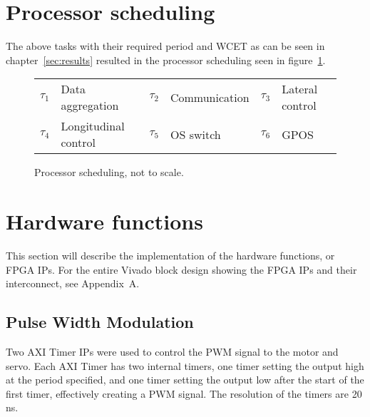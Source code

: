\section{Processor scheduling}
The above tasks with their required period and WCET as can be seen in chapter~\ref{sec:results} resulted in the processor scheduling seen in figure~\ref{fig:rtsched}.

\begin{figure}[H]
\centering
\begin{RTGrid}[nonumbers=1]{6}{25}








\end{RTGrid}
\caption{Processor scheduling, not to scale.}\label{fig:rtsched}
\begin{tabular}{r@{: }l r@{: }l r@{: }l}
$\tau_1$ & Data aggregation & $\tau_2$ & Communication & $\tau_3$ & Lateral control\\
$\tau_4$ & Longitudinal control & $\tau_5$ & OS switch & $\tau_6$ & GPOS
\end{tabular}
\end{figure}

\section{Hardware functions}
This section will describe the implementation of the hardware functions, or FPGA IPs. For the entire Vivado block design showing the FPGA IPs and their interconnect, see Appendix~A.

\subsection{Pulse Width Modulation}
Two AXI Timer IPs were used to control the PWM signal to the motor and servo. Each AXI Timer has two internal timers, one timer setting the output high at the period specified, and one timer setting the output low after the start of the first timer, effectively creating a PWM signal. The resolution of the timers are 20 ns.

